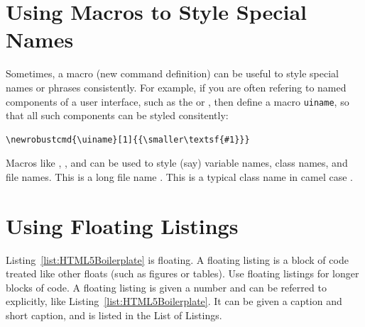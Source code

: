 \section{Using Macros to Style Special Names}

Sometimes, a macro (new command definition) can be useful to style
special names or phrases consistently. For example, if you are often
refering to named components of a user interface, such as the
 or , then define a macro
\verb|uiname|, so that all such components can be styled consitently:
\begin{lstlisting}
\newrobustcmd{\uiname}[1]{{\smaller\textsf{#1}}}
\end{lstlisting}

Macros like , , and  can be
used to style (say) variable names, class names, and file names. This
is a long file name
. This is a typical
class name in camel case .






\section{Using Floating Listings}

Listing~\ref{list:HTML5Boilerplate} is floating. A floating listing is
a block of code treated like other \LaTeXe floats (such as figures or
tables). Use floating listings for longer blocks of code.
A floating listing is given a number and can be referred to
explicitly, like Listing~\ref{list:HTML5Boilerplate}. It can be given
a caption and short caption, and is listed in the List of Listings.


